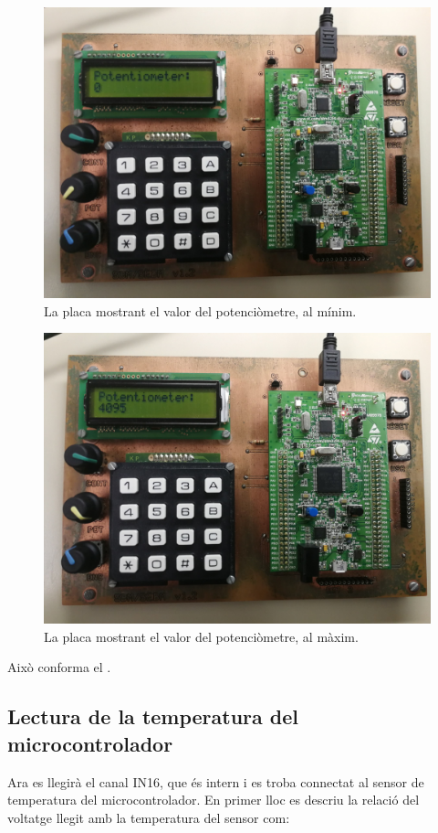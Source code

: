 \begin{figure}[p] %
  \includegraphics[width=.82\columnwidth]{../photos/board/c2-pot-zero_1}
  \caption{ \label{fig:c2-board-pot-zero} La placa mostrant el valor del potenciòmetre, al mínim. }
\end{figure}
\begin{figure}[p]
  \includegraphics[width=.82\columnwidth]{../photos/board/c2-pot-full}
  \caption{ \label{fig:c2-board-pot-full} La placa mostrant el valor del potenciòmetre, al màxim. }
\end{figure}

Això conforma el .


\clearpage
\subsection{Lectura de la temperatura del microcontrolador}

Ara es llegirà el canal IN16, que és intern i es troba connectat al
sensor de temperatura del microcontrolador. En primer lloc es descriu
la relació del voltatge llegit amb la temperatura del sensor com:

